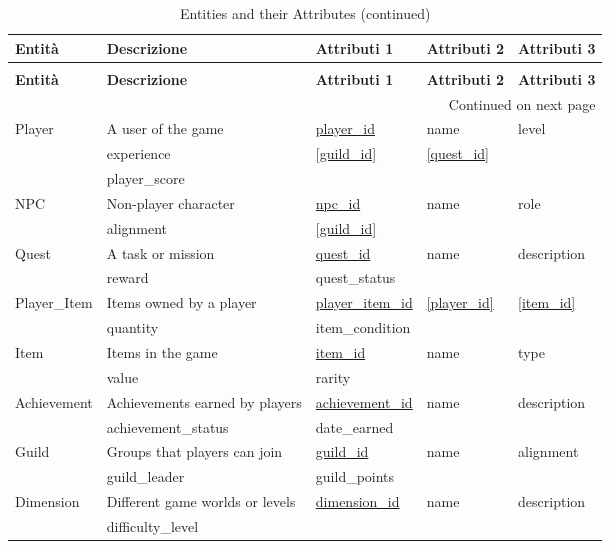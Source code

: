 \documentclass{article}
\begin{document}
\begin{longtable}{|l|l|l|l|l|}
\caption{Entities and their Attributes} \\
\hline
\textbf{Entità} & \textbf{Descrizione} & \textbf{Attributi 1} & \textbf{Attributi 2} & \textbf{Attributi 3} \\ \hline
\endfirsthead
\caption[]{Entities and their Attributes (continued)} \\
\hline
\textbf{Entità} & \textbf{Descrizione} & \textbf{Attributi 1} & \textbf{Attributi 2} & \textbf{Attributi 3} \\ \hline
\endhead
\hline \multicolumn{5}{|r|}{{Continued on next page}} \\ \hline
\endfoot
\hline
\endlastfoot
Player & A user of the game & \underline{player\_id} & name & level \\ \cline{3-5}
       & experience & \underline{[guild\_id]} & \underline{[quest\_id]} & \\ \cline{3-5}
       & player\_score & & & \\ \hline
NPC & Non-player character & \underline{npc\_id} & name & role \\ \cline{3-5}
    & alignment & \underline{[guild\_id]} & & \\ \hline
Quest & A task or mission & \underline{quest\_id} & name & description \\ \cline{3-5}
      & reward & quest\_status & & \\ \hline
Player\_Item & Items owned by a player & \underline{player\_item\_id} & \underline{[player\_id]} & \underline{[item\_id]} \\ \cline{3-5}
             & quantity & item\_condition & & \\ \hline
Item & Items in the game & \underline{item\_id} & name & type \\ \cline{3-5}
     & value & rarity & & \\ \hline
Achievement & Achievements earned by players & \underline{achievement\_id} & name & description \\ \cline{3-5}
            & achievement\_status & date\_earned & & \\ \hline
Guild & Groups that players can join & \underline{guild\_id} & name & alignment \\ \cline{3-5}
      & guild\_leader & guild\_points & & \\ \hline
Dimension & Different game worlds or levels & \underline{dimension\_id} & name & description \\ \cline{3-5}
          & difficulty\_level & & & \\ \hline
\end{longtable}
\end{document}
